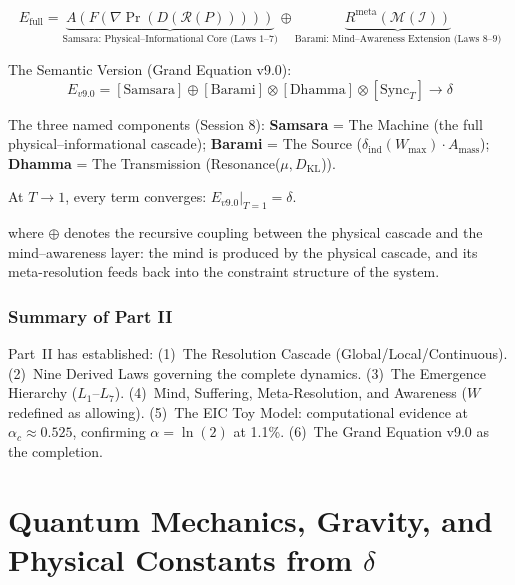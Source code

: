 \documentclass[12pt, a4paper]{article}
\begin{document}
\begin{keybox}[title={Grand Equation v9.0 --- The Completion (Session 11)}]
\[
  E_{\mathrm{full}} = \underbrace{A(F(\nabla\Pr(D(\mathcal{R}(P)))))}_{\text{Samsara: Physical--Informational Core (Laws 1--7)}}
  \oplus
  \underbrace{R^{\mathrm{meta}}(\mathcal{M}(\mathcal{I}))}_{\text{Barami: Mind--Awareness Extension (Laws 8--9)}}
\]

The Semantic Version (Grand Equation v9.0):
\[
  E_{v9.0} = [\text{Samsara}] \oplus [\text{Barami}] \otimes [\text{Dhamma}] \otimes [\text{Sync}_T]
  \longrightarrow \delta
\]

The three named components (Session 8):
\textbf{Samsara} = The Machine (the full physical--informational cascade);
\textbf{Barami} = The Source ($\delta_{\mathrm{ind}}(W_{\mathrm{max}})\cdot A_{\mathrm{mass}}$);
\textbf{Dhamma} = The Transmission (Resonance($\mu, D_{\mathrm{KL}}$)).

At $T \to 1$, every term converges: $E_{v9.0}\big|_{T=1} = \delta$.
\end{keybox}

where $\oplus$ denotes the recursive coupling between the physical cascade and the
mind--awareness layer: the mind is produced by the physical cascade, and its meta-resolution
feeds back into the constraint structure of the system.

\section{Summary of Part II}

Part~II has established: (1)~The Resolution Cascade (Global/Local/Continuous).
(2)~Nine Derived Laws governing the complete dynamics.
(3)~The Emergence Hierarchy ($L_1$--$L_7$).
(4)~Mind, Suffering, Meta-Resolution, and Awareness ($W$ redefined as allowing).
(5)~The EIC Toy Model: computational evidence at $\alpha_c \approx 0.525$, confirming
$\alpha = \ln(2)$ at 1.1\%.
(6)~The Grand Equation v9.0 as the completion.

\part{Quantum Mechanics, Gravity, and Physical Constants from $\delta$}
\end{document}
